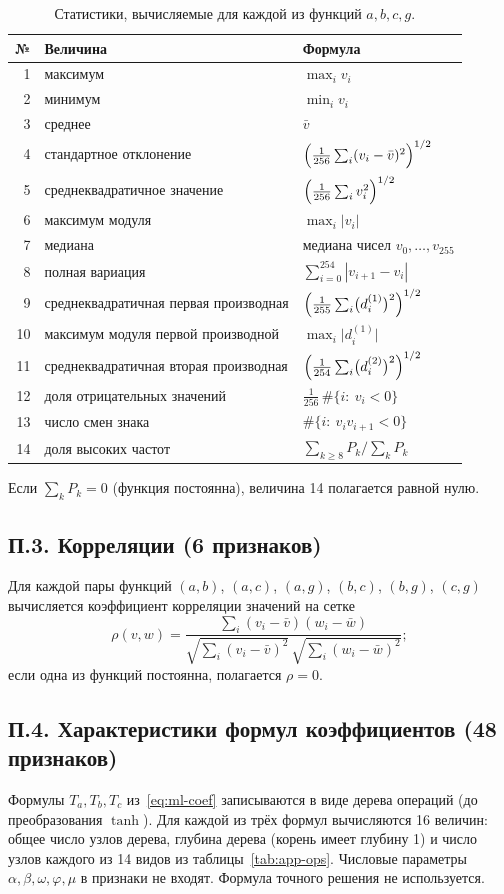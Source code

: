 \documentclass[14pt,a4paper]{extarticle}
\begin{document}
\begin{table}[!htbp]
\centering
\caption{Статистики, вычисляемые для каждой из функций $a,b,c,g$.}
\label{tab:app-stats}
\renewcommand{\arraystretch}{1.25}
\begin{tabular}{r>{\raggedright\arraybackslash}p{}l}
\toprule
№ & Величина & Формула\\
\midrule
1 & максимум & $\max_i v_i$\\
2 & минимум & $\min_i v_i$\\
3 & среднее & $\bar v$\\
4 & стандартное отклонение & $\Bigl(\frac1{256}\sum_i(v_i-\bar v)^2\Bigr)^{1/2}$\\
5 & среднеквадратичное значение & $\Bigl(\frac1{256}\sum_i v_i^2\Bigr)^{1/2}$\\
6 & максимум модуля & $\max_i|v_i|$\\
7 & медиана & медиана чисел $v_0,\dots,v_{255}$\\
8 & полная вариация & $\sum_{i=0}^{254}|v_{i+1}-v_i|$\\
9 & среднеквадратичная первая производная & $\Bigl(\frac1{255}\sum_i\bigl(d^{(1)}_i\bigr)^2\Bigr)^{1/2}$\\
10 & максимум модуля первой производной & $\max_i\bigl|d^{(1)}_i\bigr|$\\
11 & среднеквадратичная вторая производная & $\Bigl(\frac1{254}\sum_i\bigl(d^{(2)}_i\bigr)^2\Bigr)^{1/2}$\\
12 & доля отрицательных значений & $\frac1{256}\,\#\{i:\ v_i<0\}$\\
13 & число смен знака & $\#\{i:\ v_iv_{i+1}<0\}$\\
14 & доля высоких частот & $\sum_{k\ge8}P_k\big/\sum_kP_k$\\
\bottomrule
\end{tabular}
\end{table}
Если $\sum_kP_k=0$ (функция постоянна), величина 14 полагается равной нулю.

\subsection*{П.3. Корреляции (6 признаков)}
Для каждой пары функций $(a,b)$, $(a,c)$, $(a,g)$, $(b,c)$, $(b,g)$,
$(c,g)$ вычисляется коэффициент корреляции значений на сетке
\[
\rho(v,w)=\frac{\sum_i(v_i-\bar v)(w_i-\bar w)}
{\sqrt{\sum_i(v_i-\bar v)^2}\,\sqrt{\sum_i(w_i-\bar w)^2}};
\]
если одна из функций постоянна, полагается $\rho=0$.

\subsection*{П.4. Характеристики формул коэффициентов (48 признаков)}
Формулы $T_a,T_b,T_c$ из~\eqref{eq:ml-coef} записываются в виде дерева
операций (до преобразования $\tanh$). Для каждой из трёх формул
вычисляются 16 величин: общее число узлов дерева, глубина дерева
(корень имеет глубину 1) и число узлов каждого из 14 видов
из таблицы~\ref{tab:app-ops}. Числовые параметры $\alpha,\beta,\omega,
\varphi,\mu$ в признаки не входят. Формула точного решения не используется.
\end{document}
